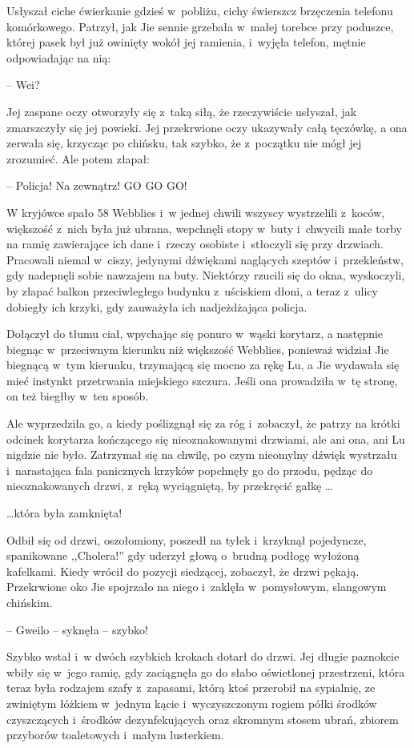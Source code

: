 \documentclass[oneside,polish,11pt,rmheadings]{mwbk}
\begin{document}
Usłyszał ciche ćwierkanie gdzieś w~pobliżu, cichy świerszcz brzęczenia telefonu komórkowego. Patrzył, jak Jie sennie grzebała w~małej torebce przy poduszce, której pasek był już owinięty wokół jej ramienia, i~wyjęła telefon, mętnie odpowiadając na nią: 

-- Wei?

Jej zaspane oczy otworzyły się z~taką siłą, że rzeczywiście usłyszał, jak zmarszczyły się jej powieki. Jej przekrwione oczy ukazywały całą tęczówkę, a ona zerwała się, krzycząc po chińsku, tak szybko, że z~początku nie mógł jej zrozumieć. Ale potem złapał: 

-- Policja! Na zewnątrz! GO GO GO!

W kryjówce spało 58 Webblies i~w jednej chwili wszyscy wystrzelili z~koców, większość z~nich była już ubrana, wepchnęli stopy w~buty i~chwycili małe torby na ramię zawierające ich dane i~rzeczy osobiste i~stłoczyli się przy drzwiach. Pracowali niemal w~ciszy, jedynymi dźwiękami naglących szeptów i~przekleństw, gdy nadepnęli sobie nawzajem na buty. Niektórzy rzucili się do okna, wyskoczyli, by złapać balkon przeciwległego budynku z~uściskiem dłoni, a teraz z~ulicy dobiegły ich krzyki, gdy zauważyła ich nadjeżdżająca policja.

Dołączył do tłumu ciał, wpychając się ponuro w~wąski korytarz, a następnie biegnąc w~przeciwnym kierunku niż większość Webblies, ponieważ widział Jie biegnącą w~tym kierunku, trzymającą się mocno za rękę Lu, a Jie wydawała się mieć instynkt przetrwania miejskiego szczura. Jeśli ona prowadziła w~tę stronę, on też biegłby w~ten sposób.

Ale wyprzedziła go, a kiedy poślizgnął się za róg i~zobaczył, że patrzy na krótki odcinek korytarza kończącego się nieoznakowanymi drzwiami, ale ani ona, ani Lu nigdzie nie było. Zatrzymał się na chwilę, po czym nieomylny dźwięk wystrzału i~narastająca fala panicznych krzyków popchnęły go do przodu, pędząc do nieoznakowanych drzwi, z~ręką wyciągniętą, by przekręcić gałkę \ldots 

 \ldots  która była zamknięta!

Odbił się od drzwi, oszołomiony, poszedł na tyłek i~krzyknął pojedyncze, spanikowane ,,Cholera!'' gdy uderzył głową o~brudną podłogę wyłożoną kafelkami. Kiedy wrócił do pozycji siedzącej, zobaczył, że drzwi pękają. Przekrwione oko Jie spojrzało na niego i~zaklęła w~pomysłowym, slangowym chińskim.

 -- Gweilo -- syknęła -- szybko!

Szybko wstał i~w dwóch szybkich krokach dotarł do drzwi. Jej długie paznokcie wbiły się w~jego ramię, gdy zaciągnęła go do słabo oświetlonej przestrzeni, która teraz była rodzajem szafy z~zapasami, którą ktoś przerobił na sypialnię, ze zwiniętym łóżkiem w~jednym kącie i~wyczyszczonym rogiem półki środków czyszczących i~środków dezynfekujących oraz skromnym stosem ubrań, zbiorem przyborów toaletowych i~małym lusterkiem.
\end{document}

